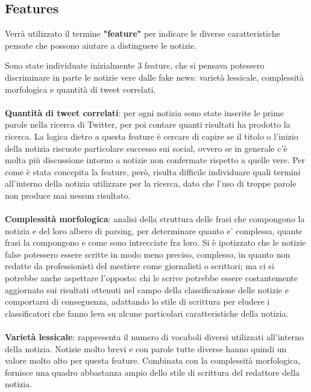 \documentclass{article}
\begin{document}
\begin{multicols}{2}
	    \section{Features}
		    Verrà utilizzato il termine \textbf{"feature"} per indicare le diverse caratteristiche pensate che possono aiutare a distinguere le notizie.
		    
			Sono state individuate inizialmente 3 feature, che si pensava potessero discriminare in parte le notizie vere dalle fake news: varietà lessicale, complessità morfologica e quantità di tweet correlati. 				
			\\~\\
			\textbf{Quantità di tweet correlati}: per ogni notizia sono state inserite le prime parole nella ricerca di Twitter, per poi contare quanti risultati ha prodotto la ricerca. La logica dietro a questa feature è cercare di capire se il titolo o l'inizio della notizia riscuote particolare successo sui social, ovvero se in generale c'è molta più discussione intorno a notizie non confermate rispetto a quelle vere. Per come è stata concepita la feature, però, risulta difficile individuare quali termini all'interno della notizia utilizzare per la ricerca, dato che l'uso di troppe parole non produce mai nessun risultato.
			\\~\\
			\textbf{Complessità morfologica}: analisi della struttura delle frasi che compongono la notizia e del loro albero di parsing, per determinare quanto e' complessa, quante frasi la compongono e come sono intrecciate fra loro.
			Si è ipotizzato che le notizie false potessero essere scritte in modo meno preciso, complesso, in quanto non redatte da professionisti del mestiere come giornalisti o scrittori; ma ci si potrebbe anche aspettare l'opposto: chi le scrive potrebbe essere costantemente aggiornato sui risultati ottenuti nel campo della classificazione delle notizie e comportarsi di conseguenza, adattando lo stile di scrittura per eludere i classificatori che fanno leva su alcune particolari caratteristiche della notizia.
			\\~\\
			\textbf{Varietà lessicale}: rappresenta il numero di vocaboli diversi utilizzati all'interno della notizia. Notizie molto brevi e con parole tutte diverse hanno quindi un valore molto alto per questa feature.
			Combinata con la complessità morfologica, fornisce una quadro abbastanza ampio dello stile di scrittura del redattore della notizia.


\end{multicols}
\end{document}
